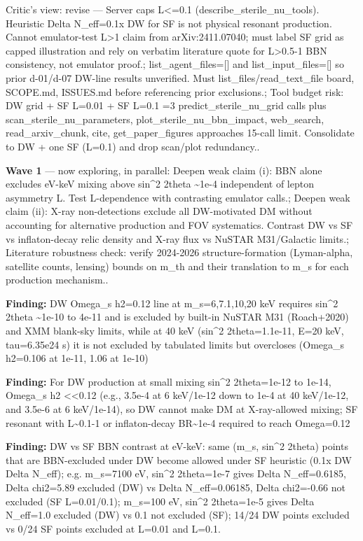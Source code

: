 \documentclass[11pt,a4paper]{article}
\begin{document}
\begin{enumerate}
Critic's view: revise --- Server caps L\textless{}=0.1 (describe\_sterile\_nu\_tools). Heuristic Delta N\_eff=0.1x DW for SF is not physical resonant production. Cannot emulator-test L\textgreater{}1 claim from arXiv:2411.07040; must label SF grid as capped illustration and rely on verbatim literature quote for L\textgreater{}0.5-1 BBN consistency, not emulator proof.; list\_agent\_files=[] and list\_input\_files=[] so prior d-01/d-07 DW-line results unverified. Must list\_files/read\_text\_file board, SCOPE.md, ISSUES.md before referencing prior exclusions.; Tool budget risk: DW grid + SF L=0.01 + SF L=0.1 =3 predict\_sterile\_nu\_grid calls plus scan\_sterile\_nu\_parameters, plot\_sterile\_nu\_bbn\_impact, web\_search, read\_arxiv\_chunk, cite, get\_paper\_figures approaches 15-call limit. Consolidate to DW + one SF (L=0.1) and drop scan/plot redundancy..

\end{enumerate}
\textbf{Wave 1} --- now exploring, in parallel: Deepen weak claim (i): BBN alone excludes eV-keV mixing above sin\textasciicircum{}2 2theta \textasciitilde{}1e-4 independent of lepton asymmetry L. Test L-dependence with contrasting emulator calls.; Deepen weak claim (ii): X-ray non-detections exclude all DW-motivated DM without accounting for alternative production and FOV systematics. Contrast DW vs SF vs inflaton-decay relic density and X-ray flux vs NuSTAR M31/Galactic limits.; Literature robustness check: verify 2024-2026 structure-formation (Lyman-alpha, satellite counts, lensing) bounds on m\_th and their translation to m\_s for each production mechanism..

\textbf{Finding:} DW Omega\_s h2=0.12 line at m\_s=6,7.1,10,20 keV requires sin\textasciicircum{}2 2theta \textasciitilde{}1e-10 to 4e-11 and is excluded by built-in NuSTAR M31 (Roach+2020) and XMM blank-sky limits, while at 40 keV (sin\textasciicircum{}2 2theta=1.1e-11, E=20 keV, tau=6.35e24 s) it is not excluded by tabulated limits but overcloses (Omega\_s h2=0.106 at 1e-11, 1.06 at 1e-10)

\textbf{Finding:} For DW production at small mixing sin\textasciicircum{}2 2theta=1e-12 to 1e-14, Omega\_s h2 \textless{}\textless{}0.12 (e.g., 3.5e-4 at 6 keV/1e-12 down to 1e-4 at 40 keV/1e-12, and 3.5e-6 at 6 keV/1e-14), so DW cannot make DM at X-ray-allowed mixing; SF resonant with L\textasciitilde{}0.1-1 or inflaton-decay BR\textasciitilde{}1e-4 required to reach Omega=0.12

\textbf{Finding:} DW vs SF BBN contrast at eV-keV: same (m\_s, sin\textasciicircum{}2 2theta) points that are BBN-excluded under DW become allowed under SF heuristic (0.1x DW Delta N\_eff); e.g. m\_s=7100 eV, sin\textasciicircum{}2 2theta=1e-7 gives Delta N\_eff=0.6185, Delta chi2=5.89 excluded (DW) vs Delta N\_eff=0.06185, Delta chi2=-0.66 not excluded (SF L=0.01/0.1); m\_s=100 eV, sin\textasciicircum{}2 2theta=1e-5 gives Delta N\_eff=1.0 excluded (DW) vs 0.1 not excluded (SF); 14/24 DW points excluded vs 0/24 SF points excluded at L=0.01 and L=0.1.
\end{document}
